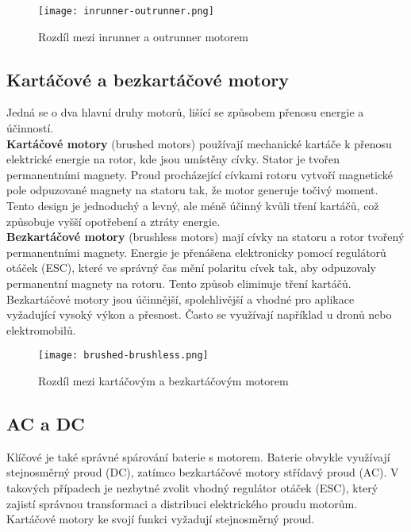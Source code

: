 \documentclass[12pt]{report}
\begin{document}
\begin{figure}[H]
	\centering
	\texttt{[image: inrunner-outrunner.png]}
	\caption{Rozdíl mezi inrunner a outrunner motorem \cite{rozum}}
	\label{fig:inrunner-outrunner.png}
  \end{figure}

\subsection{Kartáčové a bezkartáčové motory}
Jedná se o dva hlavní druhy motorů, lišící se způsobem přenosu energie a účinností.\\
\textbf{Kartáčové motory} (brushed motors) používají mechanické kartáče k přenosu elektrické energie na rotor, kde jsou umístěny cívky. Stator je tvořen permanentními magnety. Proud procházející cívkami rotoru vytvoří magnetické pole odpuzované magnety na statoru tak, že motor generuje točivý moment. Tento design je jednoduchý a levný, ale méně účinný kvůli tření kartáčů, což způsobuje vyšší opotřebení a ztráty energie.\\
\textbf{Bezkartáčové motory} (brushless motors) mají cívky na statoru a rotor tvořený permanentními magnety. Energie je přenášena elektronicky pomocí regulátorů otáček (ESC), které ve správný čas mění polaritu cívek tak, aby odpuzovaly permanentní magnety na rotoru. Tento způsob eliminuje tření kartáčů. Bezkartáčové motory jsou účinnější, spolehlivější a vhodné pro aplikace vyžadující vysoký výkon a přesnost. Často se využívají například u dronů nebo elektromobilů.


\begin{figure}[H]
	\centering
	\texttt{[image: brushed-brushless.png]}
	\caption{Rozdíl mezi kartáčovým a bezkartáčovým motorem \cite{rozum}}
	\label{fig:brushed-brushless.png}
  \end{figure}

\subsection{AC a DC}
Klíčové je také správné spárování baterie s motorem. Baterie obvykle využívají stejnosměrný proud (DC), zatímco bezkartáčové motory střídavý proud (AC). V takových případech je nezbytné zvolit vhodný regulátor otáček (ESC), který zajistí správnou transformaci a distribuci elektrického proudu motorům. Kartáčové motory ke svojí funkci vyžadují stejnosměrný proud. \cite{mainbook} \cite{dojo} \cite{ultimateguide} \cite{motors}
\end{document}
